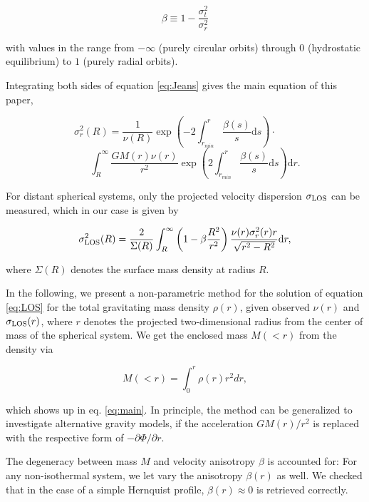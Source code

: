 \begin{equation}
\beta \equiv 1-\frac{\sigma_t^2}{\sigma_r^2}
\end{equation}

with values in the range from $-\infty$ (purely circular orbits)
through $0$ (hydrostatic equilibrium) to $1$ (purely radial orbits).

Integrating both sides of equation \ref{eq:Jeans} gives the main
equation of this paper,

\begin{equation}\label{eq:main}
\sigma_r^2(R) = \frac{1}{\nu(R)}\exp\left(-2\int_{r_{min}}^{r}\frac{\beta(s)}{s}\text{d}s\right)\cdot\qquad
\end{equation}
\begin{equation*}
\qquad\int_R^\infty \frac{GM(r)\nu(r)}{r^2} \exp\left(2\int_{r_{min}}^r\frac{\beta(s)}{s}\text{d}s\right)\text{d}r.
\end{equation*}

For distant spherical systems, only the projected velocity dispersion
$\sigma_{\text{LOS}}$ can be measured, which in our case is given by

\begin{equation}\label{eq:LOS}
\sigma_{\text{LOS}}^2(R) = \frac{2}{\Sigma(R)}\int_R^\infty \left(1-\beta\frac{R^2}{r^2}\right) \frac{\nu(r)\sigma_r^2(r) r}{\sqrt{r^2-R^2}}\text{d}r,
\end{equation}

where $\Sigma(R)$ denotes the surface mass density at radius $R$.

In the following, we present a non-parametric method for the
solution of equation \ref{eq:LOS} for the total gravitating mass
density $\rho(r)$, given observed $\nu(r)$ and $\sigma_{\text{LOS}}(r)$, where $r$
denotes the projected two-dimensional radius from the center of mass
of the spherical system. We get the enclosed mass $M(<r)$ from the
density via

\begin{equation}
M(<r) = \int_0^r \rho(r) r^2 dr,
\end{equation}

which shows up in eq. \ref{eq:main}. In principle, the method can be
generalized to investigate alternative gravity models, if the
acceleration $GM(r)/r^2$ is replaced with the respective form of
$-\partial\Phi/\partial r$.

The degeneracy between mass $M$ and velocity anisotropy $\beta$ is
accounted for: For any non-isothermal system, we let vary the
anisotropy $\beta(r)$ as well. We checked that in the case of a simple
Hernquist profile, $\beta(r)\approx0$ is retrieved correctly.

